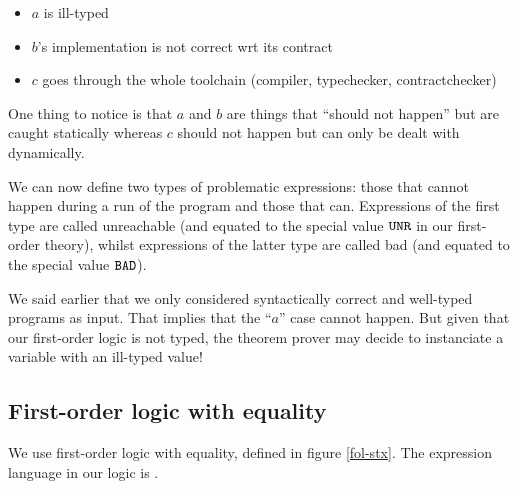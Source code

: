 \documentclass[preprint]{sigplanconf}
\begin{document}
\begin{itemize}
\item $a$ is ill-typed
\item $b$'s implementation is not correct wrt its contract
\item $c$ goes through the whole toolchain (compiler, typechecker, contractchecker)
\end{itemize}

One thing to notice is that $a$ and $b$ are things that ``should not
happen'' but are caught statically whereas $c$ should not happen but
can only be dealt with dynamically.

We can now define two types of problematic expressions: those that
cannot happen during a run of the program and those that can.
Expressions of the first type are called unreachable (and equated to
the special value $\texttt{UNR}$ in our first-order theory), whilst
expressions of the latter type are called bad (and equated to the
special value $\texttt{BAD}$).

We said earlier that we only considered syntactically correct and
well-typed programs as input. That implies that the ``$a$'' case
cannot happen. But given that our first-order logic is not typed, the
theorem prover may decide to instanciate a variable with an ill-typed
value! 

\subsection{First-order logic with equality}
We use first-order logic with equality, defined in figure \ref{fol-stx}.
 The expression language in our logic is \hprime.
\end{document}
